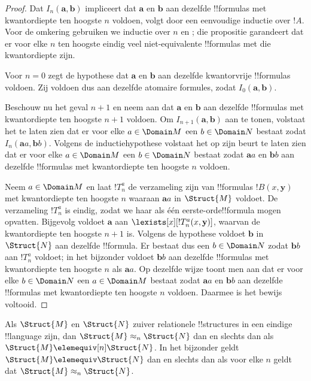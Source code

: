 \documentclass[openany]{memoir}
\begin{document}
\begin{proof}
  Dat $I_n(\mathbf{a},\mathbf{b})$ impliceert dat $\mathbf{a}$ en
  $\mathbf{b}$ aan dezelfde !!{formula}s met kwantordiepte ten hoogste
  $n$ voldoen, volgt door een eenvoudige inductie over $!A$. Voor de
  omkering gebruiken we inductie over $n$ en
  ; die propositie garandeert dat er voor elke
  $n$ ten hoogste eindig veel niet-equivalente !!{formula}s met die
  kwantordiepte zijn.

  Voor $n=0$ zegt de hypothese dat $\mathbf{a}$ en $\mathbf{b}$ aan
  dezelfde kwantorvrije !!{formula}s voldoen. Zij voldoen dus aan
  dezelfde atomaire formules, zodat $I_0(\mathbf{a},\mathbf{b})$.

  Beschouw nu het geval $n+1$ en neem aan dat $\mathbf{a}$ en
  $\mathbf{b}$ aan dezelfde !!{formula}s met kwantordiepte ten hoogste
  $n+1$ voldoen. Om $I_{n+1}(\mathbf{a},\mathbf{b})$ aan te tonen,
  volstaat het te laten zien dat er voor elke $a \in \Domain M$ een
  $b \in \Domain N$ bestaat zodat
  $I_n(\mathbf{a}a,\mathbf{b}b)$. Volgens de inductiehypothese volstaat
  het op zijn beurt te laten zien dat er voor elke $a \in \Domain M$
  een $b \in \Domain N$ bestaat zodat $\mathbf{a}a$ en
  $\mathbf{b}b$ aan dezelfde !!{formula}s met kwantordiepte ten
  hoogste $n$ voldoen.

  Neem $a \in \Domain M$ en laat $!T^a_n$ de verzameling zijn van
  !!{formula}s $!B(x,\mathbf{y})$ met kwantordiepte ten hoogste $n$
  waaraan $\mathbf{a}a$ in $\Struct{M}$ voldoet. De verzameling
  $!T^a_n$ is eindig, zodat we haar als één eerste-orde!!{formula}
  mogen opvatten. Bijgevolg voldoet $\mathbf{a}$ aan
  $\lexists[x][!T^a_n(x,\mathbf{y})]$, waarvan de kwantordiepte ten
  hoogste $n+1$ is. Volgens de hypothese voldoet $\mathbf{b}$ in
  $\Struct{N}$ aan dezelfde !!{formula}. Er bestaat dus een
  $b \in \Domain N$ zodat $\mathbf{b}b$ aan $!T^a_n$ voldoet; in het
  bijzonder voldoet $\mathbf{b}b$ aan dezelfde !!{formula}s met
  kwantordiepte ten hoogste $n$ als $\mathbf{a}a$. Op dezelfde wijze
  toont men aan dat er voor elke $b \in \Domain N$ een
  $a\in \Domain M$ bestaat zodat $\mathbf{a}a$ en $\mathbf{b}b$ aan
  dezelfde !!{formula}s met kwantordiepte ten hoogste $n$ voldoen.
  Daarmee is het bewijs voltooid.
\end{proof}

\begin{cor}
  Als $\Struct{M}$ en $\Struct{N}$ zuiver relationele !!{structure}s
  in een eindige !!{language} zijn, dan
  $\Struct{M} \approx_n\Struct{N}$ dan en slechts dan als
  $\Struct{M} \elemequiv[n] \Struct{N}$. In het bijzonder geldt
  $\Struct{M} \elemequiv \Struct{N}$ dan en slechts dan als voor elke
  $n$ geldt dat $\Struct{M} \approx_n \Struct{N}$.
\end{cor}
\endgroup
\end{document}
